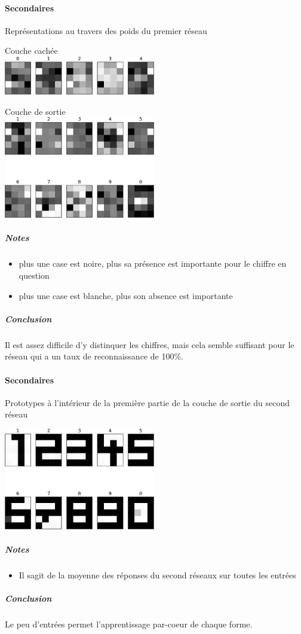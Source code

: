     \paragraph{Secondaires}
      Représentations au travers des poids du premier réseau
      \begin{center}
	Couche cachée \\
	\includegraphics[width=250px]{data/expA1/representation_hidden.png}
      \end{center}
      \begin{center}
	Couche de sortie \\
	\includegraphics[width=250px]{data/expA1/representation.png}
      \end{center} 
      \subparagraph{Notes}
	\begin{itemize}
	  \item plus une case est noire, plus sa présence est importante pour le chiffre en question
	  \item plus une case est blanche, plus son absence est importante
	\end{itemize}
      \subparagraph{Conclusion}
	Il est assez difficile d'y distinquer les chiffres, mais cela semble suffisant pour le réseau
	qui a un taux de reconnaissance de 100\%.
    \paragraph{Secondaires}
      Prototypes à l'intérieur de la première partie de la couche de sortie du second réseau
      \begin{center}
	\includegraphics[width=250px]{data/expA1/prototype.png}
      \end{center} 
      \subparagraph{Notes}
	\begin{itemize}
	  \item Il sagit de la moyenne des réponses du second réseaux sur toutes les entrées
	\end{itemize}
      \subparagraph{Conclusion}
	Le peu d'entrées permet l'apprentissage par-coeur de chaque forme.
	


